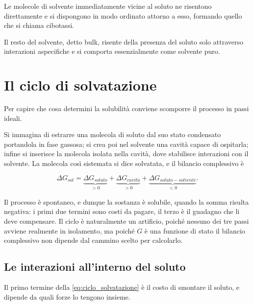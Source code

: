 Le molecole di solvente immediatamente vicine al soluto ne risentono direttamente e si dispongono in modo ordinato attorno a esso, formando quello che si chiama cibotassi. 

Il resto del solvente, detto bulk, risente della presenza del soluto solo attraverso interazioni aspecifiche e si comporta essenzialmente come solvente puro.

\newpage

\section{Il ciclo di solvatazione}

Per capire che cosa determini la solubilità conviene scomporre il processo in passi ideali.

Si immagina di estrarre una molecola di soluto dal suo stato condensato portandola in fase gassosa; si crea poi nel solvente una cavità capace di ospitarla; infine si inserisce la molecola isolata nella cavità, dove stabilisce interazioni con il solvente.
La molecola così sistemata si dice solvatata, e il bilancio complessivo è

\begin{equation}
    \Delta G_{sol} = \underbrace{\Delta G_{soluto}}_{>0} + \underbrace{\Delta G_{cavit\grave{a}}}_{>0} + \underbrace{\Delta G_{soluto-solvente}}_{<0} .
    \label{eq:ciclo_solvatazione}
\end{equation}

Il processo è spontaneo, e dunque la sostanza è solubile, quando la somma risulta negativa: i primi due termini sono costi da pagare, il terzo è il guadagno che li deve compensare.
Il ciclo è naturalmente un artificio, poiché nessuno dei tre passi avviene realmente in isolamento, ma poiché $G$ è una funzione di stato il bilancio complessivo non dipende dal cammino scelto per calcolarlo.

\subsection{Le interazioni all'interno del soluto}

Il primo termine della \eqref{eq:ciclo_solvatazione} è il costo di smontare il soluto, e dipende da quali forze lo tengono insieme.

